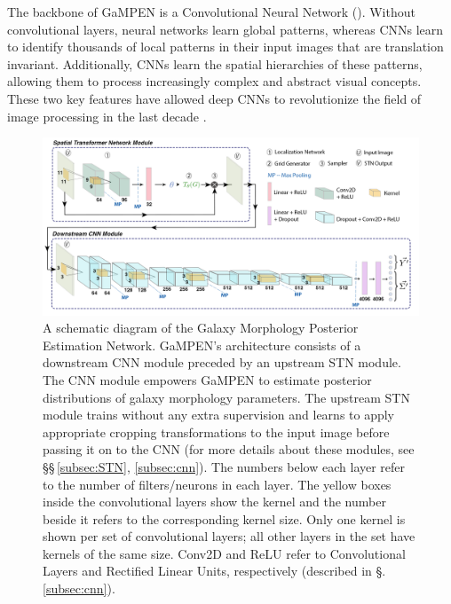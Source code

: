\documentclass[twocolumn]{aastex63}
\newcommand\gampen{GaMPEN}
\begin{document}
\begin{CJK*}{UTF8}{gbsn}

The %
backbone of \gampen{} is a Convolutional Neural Network (\citealp{fukushima_80, lecun_98}). %
Without convolutional layers, neural networks learn global patterns, whereas CNNs learn to identify thousands of local patterns in their input images that are translation invariant.
Additionally, CNNs learn the spatial hierarchies of these patterns, allowing them to process increasingly complex and abstract visual concepts. These two key features have allowed deep CNNs to revolutionize the field of image processing in the last decade \citep{lecun_15, dl_overview}. 

\begin{figure}[htb]
    \centering
    \includegraphics[width
    =\textwidth]{gampen_schematic.png}
    \caption{A schematic diagram of the Galaxy Morphology Posterior Estimation Network. \gampen's architecture consists of a downstream CNN module preceded by an upstream STN module. The CNN module empowers \gampen{} to estimate posterior distributions of galaxy morphology parameters. The upstream STN module trains without any extra supervision and learns to apply appropriate cropping transformations to the input image before passing it on to the CNN (for more details about these modules, see \S\S\,\ref{subsec:STN}, \ref{subsec:cnn}).
    The numbers below each layer refer to the number of filters/neurons in each layer. The yellow boxes inside the convolutional layers show the kernel and the number beside it refers to the corresponding kernel size. Only one kernel is shown per set of convolutional layers; all other layers in the set have kernels of the same size. Conv2D and ReLU refer to Convolutional Layers and Rectified Linear Units, respectively (described in \S.\ref{subsec:cnn}).}
    \label{fig:gampen_schematic}
\end{figure}



\end{CJK*}
\end{document}
